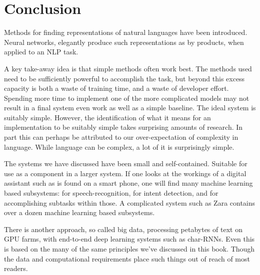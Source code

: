 \documentclass[12pt,parskip]{komatufte}
\begin{document}

\chapter{Conclusion}\label{sec:conclusion}

Methods for finding representations of natural languages have been introduced.
Neural networks, elegantly produce such representations as by products,
when applied to an NLP task.

A key take-away idea is that simple methods often work best.
The methods used need to be sufficiently powerful to accomplish the task,
but beyond this excess capacity is both a waste of training time,
and a waste of developer effort.
Spending more time to implement one of the more complicated models may not result in a final system even work as well as a simple baseline.
The ideal system is suitably simple.
However, the identification of what it means for an implementation to be suitably simple takes surprising amounts of research.
In part this can perhaps be attributed to our over-expectation of complexity in language.
While language can be complex, a lot of it is surprisingly simple.



The systems we have discussed have been small and self-contained.
Suitable for use as a component in a larger system.
If one looks at the workings of a digital assistant such as is found on a smart phone,
one will find many machine learning based subsystems:
for speech-recognition, for intent detection, and for accomplishing subtasks within those.
A complicated system such as Zara  contains over a dozen machine learning based subsystems.


There is another approach, so called big data, processing petabytes of text on GPU farms,
with end-to-end deep learning systems such as char-RNNs.
Even this is based on the many of the same principles we've discussed in this book.
Though the data and computational requirements place such things out of reach of most readers.
\end{document}
